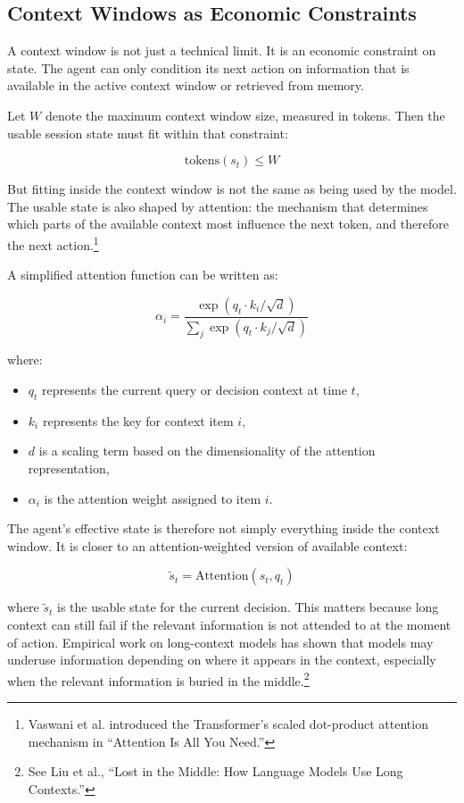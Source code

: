 \documentclass[12pt]{article}
\begin{document}
\subsection{Context Windows as Economic Constraints}

A context window is not just a technical limit. It is an economic constraint on
state. The agent can only condition its next action on information that is
available in the active context window or retrieved from memory.

Let \(W\) denote the maximum context window size, measured in tokens. Then the
usable session state must fit within that constraint:

\[
\text{tokens}(s_t) \leq W
\]

But fitting inside the context window is not the same as being used by the
model. The usable state is also shaped by attention: the mechanism that
determines which parts of the available context most influence the next token,
and therefore the next action.\footnote{Vaswani et al. introduced the
Transformer's scaled dot-product attention mechanism in ``Attention Is All You
Need.''}

A simplified attention function can be written as:

\[
\alpha_i
=
\frac{
\exp(q_t \cdot k_i / \sqrt{d})
}{
\sum_j \exp(q_t \cdot k_j / \sqrt{d})
}
\]

where:

\begin{itemize}
    \item \(q_t\) represents the current query or decision context at time \(t\),
    \item \(k_i\) represents the key for context item \(i\),
    \item \(d\) is a scaling term based on the dimensionality of the attention
    representation,
    \item \(\alpha_i\) is the attention weight assigned to item \(i\).
\end{itemize}

The agent's effective state is therefore not simply everything inside the
context window. It is closer to an attention-weighted version of available
context:

\[
\tilde{s}_t = \text{Attention}(s_t, q_t)
\]

where \(\tilde{s}_t\) is the usable state for the current decision. This matters
because long context can still fail if the relevant information is not attended
to at the moment of action. Empirical work on long-context models has shown that
models may underuse information depending on where it appears in the context,
especially when the relevant information is buried in the middle.\footnote{See
Liu et al., ``Lost in the Middle: How Language Models Use Long Contexts.''}
\end{document}
